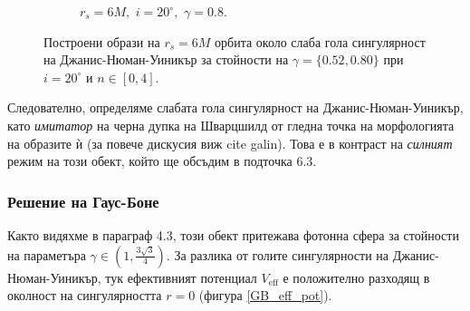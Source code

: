 \begin{figure}[!htb]
\begin{subfigure}{6cm}
		\caption{$r_s = 6M,\,\, i = 20^\circ,\,\,\gamma = 0.8$.}
	\end{subfigure}
	\caption[Построени образи на $r_s = 6M$ орбита около слаба гола сингулярност на Джанис-Нюман-Уиникър за различни стойности на $\gamma$ при $i = 20^\circ$.]{\small Построени образи на $r_s = 6M$ орбита около слаба гола сингулярност на Джанис-Нюман-Уиникър за стойности на $\gamma = \{0.52, 0.80\}$ при $i = 20^\circ$ и $n\in[0,4]$.} 
	\label{JNW_r6_20_deg}
\end{figure}

Следователно, определяме слабата гола сингулярност на Джанис-Нюман-Уиникър, като \emph{имитатор} на черна дупка на Шварцшилд от гледна точка на морфологията на образите ѝ (за повече дискусия виж cite galin). Това е в контраст на \emph{силният} режим на този обект, който ще обсъдим в подточка 6.3.

\subsubsection{Решение на Гаус-Боне} 
Както видяхме в параграф 4.3, този обект притежава фотонна сфера за стойности на параметъра $\gamma\in\left(1,\frac{3\sqrt{3}}{4}\right)$. За разлика от голите сингулярности на Джанис-Нюман-Уиникър, тук ефективният потенциал $V_\text{eff}$ е положително разходящ в околност на сингулярността $r = 0$ (фигура \ref{GB_eff_pot}).

